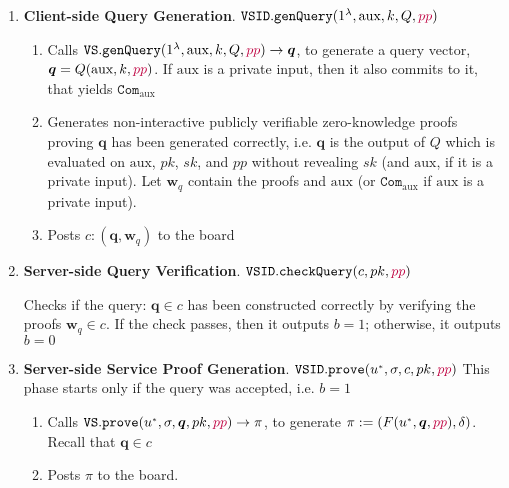 \begin{enumerate}
\item\textbf{Client-side Query Generation}\label{VSID::Client-side-QueryGeneration}. $\mathtt{VSID.genQuery}(1^{\lambda},  \text{aux},k,Q,{\color{purple}pp} )$ 
\begin{enumerate}
\item Calls $\mathtt{VS.genQuery}(1^{\lambda}, \text{aux},k,Q,{\color{purple}pp} )\rightarrow \bm{q}$, to generate a query vector, $\bm{q}=Q(\text{aux},k,{\color{purple}pp})$. If $\text{aux}$ is a private input, then it also commits to it,  that yields  $\mathtt{Com}_{\scriptscriptstyle \text{aux}}$
\item Generates non-interactive publicly verifiable zero-knowledge proofs proving $\bm{q}$ has been generated correctly, i.e. $\bm{q}$ is the
output of $Q$ which is evaluated on $\text{aux}$, $pk$, $sk$, and $pp$ without revealing $sk$ (and $\text{aux}$, if it is a private input). Let $\bm{w}_{\scriptscriptstyle q}$ contain the proofs and  $\text{aux}$ (or  $\mathtt{Com}_{\scriptscriptstyle \text{aux}}$ if $\text{aux}$ is a private input).
\item Posts $c:(\bm{q},\bm{w}_{\scriptscriptstyle q})$ to the board 
\end{enumerate}

\item\textbf{Server-side Query Verification}. $\mathtt{VSID.checkQuery}(c, pk, {\color{purple}pp})$

Checks if   the query: $\bm{q}\in c$ has been constructed correctly by verifying the proofs  $\bm{w}_{\scriptscriptstyle q}\in c$. If the check passes, then it outputs $b=1$; otherwise, it outputs $b=0$



\item\textbf{Server-side Service Proof Generation}. $\mathtt{VSID.prove}(u^{\scriptscriptstyle *},\sigma,c,pk,{\color{purple}pp} )$ This phase starts only if the query was accepted, i.e. $b=1$ 
\begin{enumerate}
\item Calls $\mathtt{VS.prove}(u^{\scriptscriptstyle *},\sigma, \bm{q},pk,{\color{purple}pp})\rightarrow \pi$, to generate $\pi:=(F(u^{\scriptscriptstyle *},\bm{q},{\color{purple}pp}),\delta)$. Recall that $\bm{q}\in c$
\item Posts $\pi$ to the board. 
\end{enumerate}


\end{enumerate}

